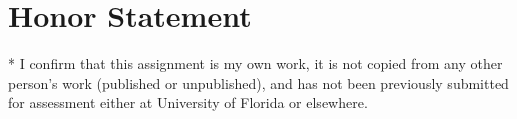 \documentclass[conference]{IEEEtran}
\begin{document}



\section*{Honor Statement}
\noindent
* I confirm that this assignment is my own work, it is not copied from any other person's work (published or unpublished), and has not been previously submitted for assessment either at University of Florida or elsewhere.




%
\end{document}
